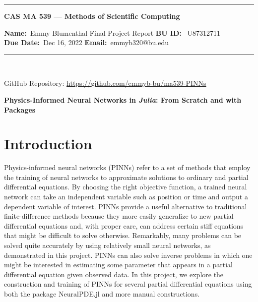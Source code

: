 \documentclass[11pt]{article}
\newcommand{\1}{\mathbf 1}
\begin{document}
{
	\begin{singlespace}
		
\begin{center}
	\hrule
	\vspace{.4cm}
	{\textbf { \large CAS MA 539 --- Methods of Scientific Computing}}
\end{center}
\textbf{Name:}\ Emmy Blumenthal \hspace{\fill} Final Project Report\hspace{\fill}  \textbf{BU ID:} \ U87312711 \\
\textbf{Due Date:}\  Dec 16, 2022   \hspace{\fill} \textbf{Email:}\ emmyb320@bu.edu \ 
\vspace{.4cm}
\hrule
\

GitHub Repository:  \url{https://github.com/emmyb-bu/ma539-PINNs}

\begin{center}
	\LARGE
	\bf
	Physics-Informed Neural Networks in {\em Julia}: From Scratch and with Packages
\end{center}

\tableofcontents

\end{singlespace}
}
\section{Introduction}

Physics-informed neural networks (PINNs) refer to a set of methods that employ the training of neural networks to approximate solutions to ordinary and partial differential equations.
By choosing the right objective function, a trained neural network can take an independent variable such as position or time and output a dependent variable of interest.
PINNs provide a useful alternative to traditional finite-difference methods because they more easily generalize to new partial differential equations and, with proper care, can address certain stiff equations that might be difficult to solve otherwise.
Remarkably, many problems can be solved quite accurately by using relatively small neural networks, as demonstrated in this project.
PINNs can also solve inverse problems in which one might be interested in estimating some parameter that appears in a partial differential equation given observed data.
In this project, we explore the construction and training of PINNs for several partial differential equations using both the package NeuralPDE.jl and more manual constructions.
\end{document}
